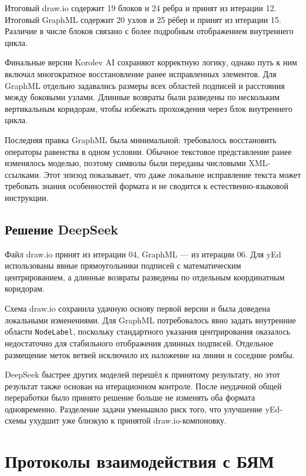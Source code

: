 \documentclass[a4paper,12pt]{extreport}
\newcommand{\code}[1]{\texttt{#1}}
\begin{document}
Итоговый draw.io содержит 19 блоков и 24 ребра и принят из итерации 12. Итоговый GraphML содержит 20 узлов и 25 рёбер и принят из итерации 15. Различие в числе блоков связано с более подробным отображением внутреннего цикла.

Финальные версии Korolev AI сохраняют корректную логику, однако путь к ним включал многократное восстановление ранее исправленных элементов. Для GraphML отдельно задавались размеры всех областей подписей и расстояния между боковыми узлами. Длинные возвраты были разведены по нескольким вертикальным коридорам, чтобы избежать прохождения через блок внутреннего цикла.

Последняя правка GraphML была минимальной: требовалось восстановить операторы равенства в одном условии. Обычное текстовое представление ранее изменялось моделью, поэтому символы были переданы числовыми XML-ссылками. Этот эпизод показывает, что даже локальное исправление текста может требовать знания особенностей формата и не сводится к естественно-языковой инструкции.

\subsection{Решение DeepSeek}

Файл draw.io принят из итерации 04, GraphML --- из итерации 06. Для yEd использованы явные прямоугольники подписей с математическим центрированием, а длинные возвраты разведены по отдельным координатным коридорам.

Схема draw.io сохранила удачную основу первой версии и была доведена локальными изменениями. Для GraphML потребовалось явно задать внутренние области \code{NodeLabel}, поскольку стандартного указания центрирования оказалось недостаточно для стабильного отображения длинных подписей. Отдельное размещение меток ветвей исключило их наложение на линии и соседние ромбы.

DeepSeek быстрее других моделей перешёл к принятому результату, но этот результат также основан на итерационном контроле. После неудачной общей переработки было принято решение больше не изменять оба формата одновременно. Разделение задачи уменьшило риск того, что улучшение yEd-схемы ухудшит уже близкую к принятой draw.io-компоновку.

\section{Протоколы взаимодействия с БЯМ}
\end{document}
